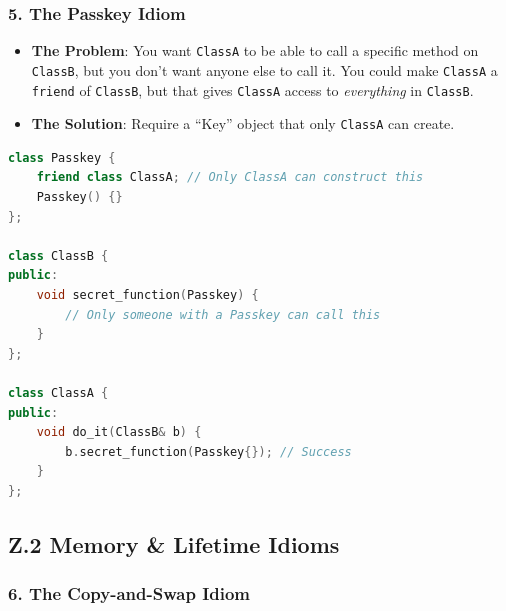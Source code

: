 \hypertarget{the-passkey-idiom}{%
\subsubsection{5. The Passkey Idiom}\label{the-passkey-idiom}}

\begin{itemize}
\tightlist
\item
  \textbf{The Problem}: You want \passthrough{\lstinline!ClassA!} to be
  able to call a specific method on \passthrough{\lstinline!ClassB!},
  but you don't want anyone else to call it. You could make
  \passthrough{\lstinline!ClassA!} a \passthrough{\lstinline!friend!} of
  \passthrough{\lstinline!ClassB!}, but that gives
  \passthrough{\lstinline!ClassA!} access to \emph{everything} in
  \passthrough{\lstinline!ClassB!}.
\item
  \textbf{The Solution}: Require a ``Key'' object that only
  \passthrough{\lstinline!ClassA!} can create.
\end{itemize}

\begin{lstlisting}[language={C++}]
class Passkey {
    friend class ClassA; // Only ClassA can construct this
    Passkey() {}
};

class ClassB {
public:
    void secret_function(Passkey) {
        // Only someone with a Passkey can call this
    }
};

class ClassA {
public:
    void do_it(ClassB& b) {
        b.secret_function(Passkey{}); // Success
    }
};
\end{lstlisting}

\hypertarget{z.2-memory-lifetime-idioms}{%
\subsection{Z.2 Memory \& Lifetime
Idioms}\label{z.2-memory-lifetime-idioms}}

\hypertarget{the-copy-and-swap-idiom}{%
\subsubsection{6. The Copy-and-Swap
Idiom}\label{the-copy-and-swap-idiom}}

